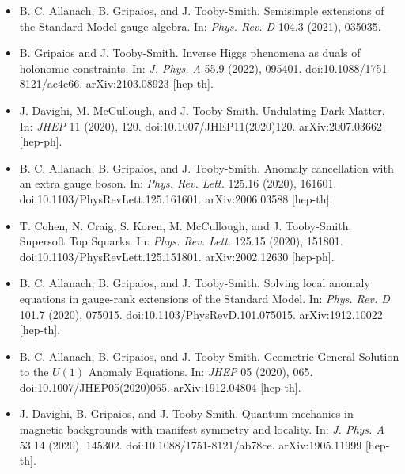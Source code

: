 \documentclass[14pt,letter]{article}
\newcommand{\includePublications}{T} %
\newcommand{\mybullet}{\textcolor{mycolor}{$\ast$}\ }
\newcounter{customtitle}
\begin{document}
\begin{itemize}[label=\mybullet]
\item B. C. Allanach, B. Gripaios, and J. Tooby-Smith. {\color{mycolor} Semisimple extensions of the Standard Model gauge algebra}. In: \emph{Phys. Rev. D} 104.3 (2021), 035035. 

\item B. Gripaios and J. Tooby-Smith. {\color{mycolor} Inverse Higgs phenomena as duals of holonomic constraints}. In: \emph{J. Phys. A} 55.9 (2022), 095401. doi:10.1088/1751-8121/ac4c66. arXiv:2103.08923 [hep-th].

\item J. Davighi, M. McCullough, and J. Tooby-Smith. {\color{mycolor} Undulating Dark Matter}. In: \emph{JHEP} 11 (2020), 120. doi:10.1007/JHEP11(2020)120. arXiv:2007.03662 [hep-ph].

\item B. C. Allanach, B. Gripaios, and J. Tooby-Smith. {\color{mycolor} Anomaly cancellation with an extra gauge boson}. In: \emph{Phys. Rev. Lett.} 125.16 (2020), 161601. doi:10.1103/PhysRevLett.125.161601. arXiv:2006.03588 [hep-th].

\item T. Cohen, N. Craig, S. Koren, M. McCullough, and J. Tooby-Smith. {\color{mycolor} Supersoft Top Squarks}. In: \emph{Phys. Rev. Lett.} 125.15 (2020), 151801. doi:10.1103/PhysRevLett.125.151801. arXiv:2002.12630 [hep-ph].

\item B. C. Allanach, B. Gripaios, and J. Tooby-Smith. {\color{mycolor} Solving local anomaly equations in gauge-rank extensions of the Standard Model}. In: \emph{Phys. Rev. D} 101.7 (2020), 075015. doi:10.1103/PhysRevD.101.075015. arXiv:1912.10022 [hep-th].

\item B. C. Allanach, B. Gripaios, and J. Tooby-Smith. {\color{mycolor} Geometric General Solution to the $U(1)$ Anomaly Equations}. In: \emph{JHEP} 05 (2020), 065. doi:10.1007/JHEP05(2020)065. arXiv:1912.04804 [hep-th].

\item J. Davighi, B. Gripaios, and J. Tooby-Smith. {\color{mycolor} Quantum mechanics in magnetic backgrounds with manifest symmetry and locality}. In: \emph{J. Phys. A} 53.14 (2020), 145302. doi:10.1088/1751-8121/ab78ce. arXiv:1905.11999 [hep-th].
\end{itemize}

\end{document}
